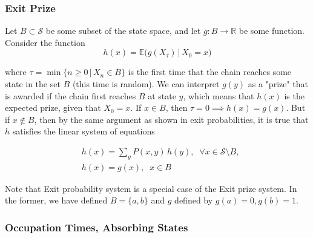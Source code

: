 \documentclass{article}
\begin{document}
    \subsubsection{Exit Prize}

      Let $B \subset \mathcal{S}$ be some subset of the state space, and let $g: B \longrightarrow \mathbb{R}$ be some function. Consider the function 
      \begin{equation}
        h(x) = \mathbb{E}\big( g(X_\tau) \, |\, X_0 = x \big)
      \end{equation}

      where $\tau = \min\{ n\geq 0 \,|\, X_n \in B\}$ is the first time that the chain reaches some state in the set $B$ (this time is random). We can interpret $g(y)$ as a "prize" that is awarded if the chain first reaches $B$ at state $y$, which means that $h(x)$ is the expected prize, given that $X_0 = x$. If $x \in B$, then $\tau = 0 \implies h(x) = g(x)$. But if $x \not\in B$, then by the same argument as shown in exit probabilities, it is true that $h$ satisfies the linear system of equations

      \begin{align*}
        & h(x) = \sum_g P(x, y)\,h(y), \;\; \forall x \in \mathcal{S} \setminus B, \\
        & h(x) = g(x), \;\; x \in B 
      \end{align*}

      Note that Exit probability system is a special case of the Exit prize system. In the former, we have defined $B = \{a, b\}$ and $g$ defined by $g(a) = 0, g(b) = 1$. 

    \subsubsection{Occupation Times, Absorbing States}
\end{document}
